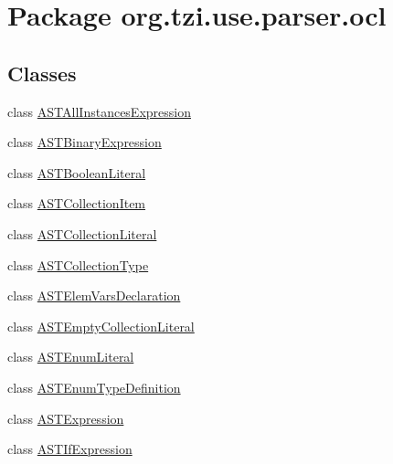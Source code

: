 \hypertarget{namespaceorg_1_1tzi_1_1use_1_1parser_1_1ocl}{\section{Package org.\-tzi.\-use.\-parser.\-ocl}
\label{namespaceorg_1_1tzi_1_1use_1_1parser_1_1ocl}
}
\subsection*{Classes}
\begin{DoxyCompactItemize}
\item 
class \hyperlink{classorg_1_1tzi_1_1use_1_1parser_1_1ocl_1_1_a_s_t_all_instances_expression}{A\-S\-T\-All\-Instances\-Expression}
\item 
class \hyperlink{classorg_1_1tzi_1_1use_1_1parser_1_1ocl_1_1_a_s_t_binary_expression}{A\-S\-T\-Binary\-Expression}
\item 
class \hyperlink{classorg_1_1tzi_1_1use_1_1parser_1_1ocl_1_1_a_s_t_boolean_literal}{A\-S\-T\-Boolean\-Literal}
\item 
class \hyperlink{classorg_1_1tzi_1_1use_1_1parser_1_1ocl_1_1_a_s_t_collection_item}{A\-S\-T\-Collection\-Item}
\item 
class \hyperlink{classorg_1_1tzi_1_1use_1_1parser_1_1ocl_1_1_a_s_t_collection_literal}{A\-S\-T\-Collection\-Literal}
\item 
class \hyperlink{classorg_1_1tzi_1_1use_1_1parser_1_1ocl_1_1_a_s_t_collection_type}{A\-S\-T\-Collection\-Type}
\item 
class \hyperlink{classorg_1_1tzi_1_1use_1_1parser_1_1ocl_1_1_a_s_t_elem_vars_declaration}{A\-S\-T\-Elem\-Vars\-Declaration}
\item 
class \hyperlink{classorg_1_1tzi_1_1use_1_1parser_1_1ocl_1_1_a_s_t_empty_collection_literal}{A\-S\-T\-Empty\-Collection\-Literal}
\item 
class \hyperlink{classorg_1_1tzi_1_1use_1_1parser_1_1ocl_1_1_a_s_t_enum_literal}{A\-S\-T\-Enum\-Literal}
\item 
class \hyperlink{classorg_1_1tzi_1_1use_1_1parser_1_1ocl_1_1_a_s_t_enum_type_definition}{A\-S\-T\-Enum\-Type\-Definition}
\item 
class \hyperlink{classorg_1_1tzi_1_1use_1_1parser_1_1ocl_1_1_a_s_t_expression}{A\-S\-T\-Expression}
\item 
class \hyperlink{classorg_1_1tzi_1_1use_1_1parser_1_1ocl_1_1_a_s_t_if_expression}{A\-S\-T\-If\-Expression}
\item 

\end{DoxyCompactItemize}
